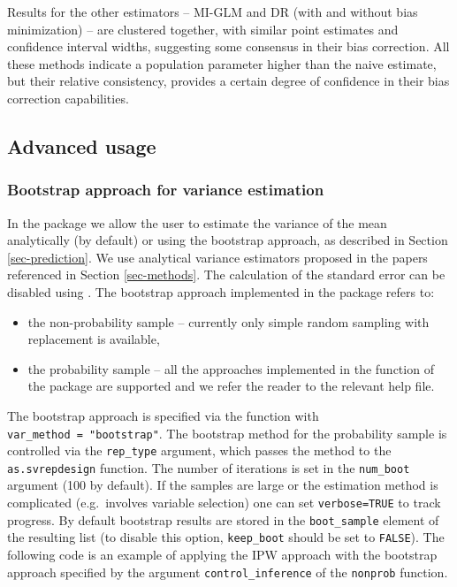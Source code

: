 \documentclass[
]{jss}
\begin{document}
Results for the other estimators -- MI-GLM and DR (with and without bias
minimization) -- are clustered together, with similar point estimates
and confidence interval widths, suggesting some consensus in their bias
correction. All these methods indicate a population parameter higher
than the naive estimate, but their relative consistency, provides a
certain degree of confidence in their bias correction capabilities.

\subsection{Advanced usage}\label{advanced-usage}

\subsubsection{Bootstrap approach for variance
estimation}\label{bootstrap-approach-for-variance-estimation}

In the package we allow the user to estimate the variance of the mean
analytically (by default) or using the bootstrap approach, as described
in Section \ref{sec-prediction}. We use analytical variance estimators
proposed in the papers referenced in Section \ref{sec-methods}. The
calculation of the standard error can be disabled using
. The bootstrap approach implemented in the
package refers to:

\begin{itemize}
\item the non-probability sample -- currently only simple random sampling with replacement is available,
\item the probability sample -- all the approaches implemented in the  function of the  package are supported and we refer the reader to the relevant help file. 
\end{itemize}

The bootstrap approach is specified via the 
function with \texttt{var\_method\ =\ "bootstrap"}. The bootstrap method
for the probability sample is controlled via the \texttt{rep\_type}
argument, which passes the method to the \texttt{as.svrepdesign}
function. The number of iterations is set in the \texttt{num\_boot}
argument (100 by default). If the samples are large or the estimation
method is complicated (e.g.~involves variable selection) one can set
\texttt{verbose=TRUE} to track progress. By default bootstrap results
are stored in the \texttt{boot\_sample} element of the resulting list
(to disable this option, \texttt{keep\_boot} should be set to
\texttt{FALSE}). The following code is an example of applying the IPW
approach with the bootstrap approach specified by the argument
\texttt{control\_inference} of the \texttt{nonprob} function.
\end{document}
